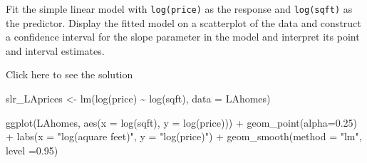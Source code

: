 \documentclass[
  letterpaper,
  DIV=11,
  numbers=noendperiod]{scrartcl}
\newenvironment{Shaded}{\begin{snugshade}}{\end{snugshade}}
\newcommand{\AttributeTok}[1]{\textcolor[rgb]{0.40,0.45,0.13}{#1}}
\newcommand{\FloatTok}[1]{\textcolor[rgb]{0.68,0.00,0.00}{#1}}
\newcommand{\FunctionTok}[1]{\textcolor[rgb]{0.28,0.35,0.67}{#1}}
\newcommand{\NormalTok}[1]{\textcolor[rgb]{0.00,0.23,0.31}{#1}}
\newcommand{\OtherTok}[1]{\textcolor[rgb]{0.00,0.23,0.31}{#1}}
\newcommand{\SpecialCharTok}[1]{\textcolor[rgb]{0.37,0.37,0.37}{#1}}
\newcommand{\StringTok}[1]{\textcolor[rgb]{0.13,0.47,0.30}{#1}}
\begin{document}
\begin{tcolorbox}[enhanced jigsaw, toprule=.15mm, breakable, bottomtitle=1mm, coltitle=black, colback=white, arc=.35mm, left=2mm, leftrule=.75mm, opacitybacktitle=0.6, colframe=quarto-callout-warning-color-frame, colbacktitle=quarto-callout-warning-color!10!white, toptitle=1mm, titlerule=0mm, opacityback=0, title={Task 2}, rightrule=.15mm, bottomrule=.15mm]

Fit the simple linear model with \texttt{log(price)} as the response and
\texttt{log(sqft)} as the predictor. Display the fitted model on a
scatterplot of the data and construct a confidence interval for the
slope parameter in the model and interpret its point and interval
estimates.

Click here to see the solution

\begin{Shaded}
\begin{Highlighting}[]
\NormalTok{slr\_LAprices }\OtherTok{\textless{}{-}} \FunctionTok{lm}\NormalTok{(}\FunctionTok{log}\NormalTok{(price) }\SpecialCharTok{\textasciitilde{}} \FunctionTok{log}\NormalTok{(sqft), }\AttributeTok{data =}\NormalTok{ LAhomes)}

\FunctionTok{ggplot}\NormalTok{(LAhomes, }\FunctionTok{aes}\NormalTok{(}\AttributeTok{x =}  \FunctionTok{log}\NormalTok{(sqft), }\AttributeTok{y =} \FunctionTok{log}\NormalTok{(price))) }\SpecialCharTok{+}
  \FunctionTok{geom\_point}\NormalTok{(}\AttributeTok{alpha=}\FloatTok{0.25}\NormalTok{) }\SpecialCharTok{+}
  \FunctionTok{labs}\NormalTok{(}\AttributeTok{x =} \StringTok{"log(aquare feet)"}\NormalTok{, }\AttributeTok{y =} \StringTok{"log(price)"}\NormalTok{) }\SpecialCharTok{+}
  \FunctionTok{geom\_smooth}\NormalTok{(}\AttributeTok{method =} \StringTok{"lm"}\NormalTok{, }\AttributeTok{level =}\FloatTok{0.95}\NormalTok{)}
\end{Highlighting}
\end{Shaded}


\end{tcolorbox}
\end{document}
